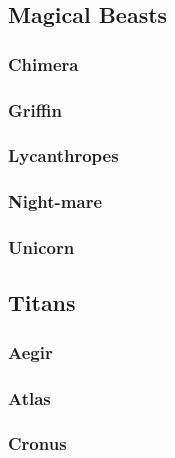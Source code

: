 \hypertarget{magical-beasts}{%
\subsection{Magical Beasts}\label{magical-beasts}}

\hypertarget{chimera}{%
\subsubsection{Chimera}\label{chimera}}

\hypertarget{griffin}{%
\subsubsection{Griffin}\label{griffin}}

\hypertarget{lycanthropes}{%
\subsubsection{Lycanthropes}\label{lycanthropes}}

\hypertarget{night-mare}{%
\subsubsection{Night-mare}\label{night-mare}}

\hypertarget{unicorn}{%
\subsubsection{Unicorn}\label{unicorn}}

\hypertarget{titans}{%
\subsection{Titans}\label{titans}}

\hypertarget{aegir}{%
\subsubsection{Aegir}\label{aegir}}

\hypertarget{atlas}{%
\subsubsection{Atlas}\label{atlas}}

\hypertarget{cronus}{%
\subsubsection{Cronus}\label{cronus}}

